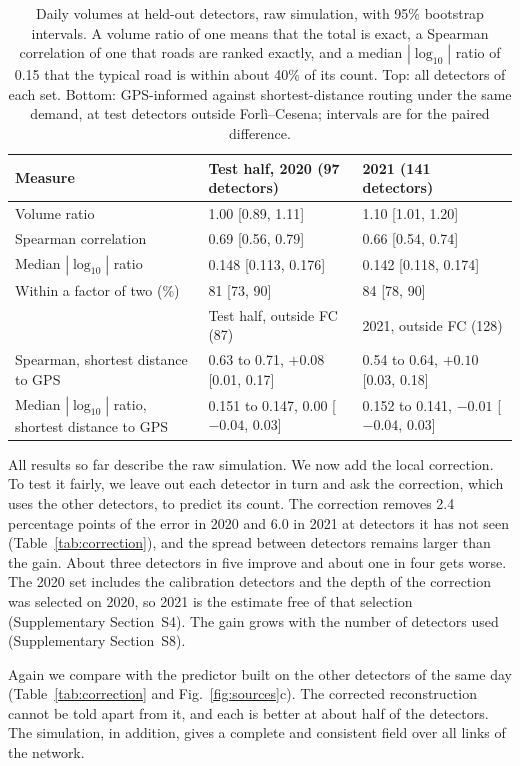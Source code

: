 \documentclass[preprint,11pt,a4paper]{elsarticle}
\begin{document}
\begin{table}[htbp]
\centering
\caption{Daily volumes at held-out detectors, raw simulation, with 95\% bootstrap intervals. A volume ratio of one means that the total is exact, a Spearman correlation of one that roads are ranked exactly, and a median $|\log_{10}|$ ratio of 0.15 that the typical road is within about 40\% of its count. Top: all detectors of each set. Bottom: GPS-informed against shortest-distance routing under the same demand, at test detectors outside Forl\`i--Cesena; intervals are for the paired difference.}
\label{tab:volumes}
\begin{tabular}{@{}lll@{}}
\toprule
Measure & Test half, 2020 (97 detectors) & 2021 (141 detectors) \\
\midrule
Volume ratio & 1.00 [0.89, 1.11] & 1.10 [1.01, 1.20] \\
Spearman correlation & 0.69 [0.56, 0.79] & 0.66 [0.54, 0.74] \\
Median $|\log_{10}|$ ratio & 0.148 [0.113, 0.176] & 0.142 [0.118, 0.174] \\
Within a factor of two (\%) & 81 [73, 90] & 84 [78, 90] \\
\midrule
 & Test half, outside FC (87) & 2021, outside FC (128) \\
Spearman, shortest distance to GPS & 0.63 to 0.71, $+0.08$ [0.01, 0.17] & 0.54 to 0.64, $+0.10$ [0.03, 0.18] \\
Median $|\log_{10}|$ ratio, shortest distance to GPS & 0.151 to 0.147, $0.00$ [$-0.04$, 0.03] & 0.152 to 0.141, $-0.01$ [$-0.04$, 0.03] \\
\bottomrule
\end{tabular}
\end{table}

All results so far describe the raw simulation. We now add the local correction. To test it fairly, we leave out each detector in turn and ask the correction, which uses the other detectors, to predict its count. The correction removes 2.4 percentage points of the error in 2020 and 6.0 in 2021 at detectors it has not seen (Table~\ref{tab:correction}), and the spread between detectors remains larger than the gain. About three detectors in five improve and about one in four gets worse. The 2020 set includes the calibration detectors and the depth of the correction was selected on 2020, so 2021 is the estimate free of that selection (Supplementary Section~S4). The gain grows with the number of detectors used (Supplementary Section~S8).

Again we compare with the predictor built on the other detectors of the same day (Table~\ref{tab:correction} and Fig.~\ref{fig:sources}c). The corrected reconstruction cannot be told apart from it, and each is better at about half of the detectors. The simulation, in addition, gives a complete and consistent field over all links of the network.
\end{document}
